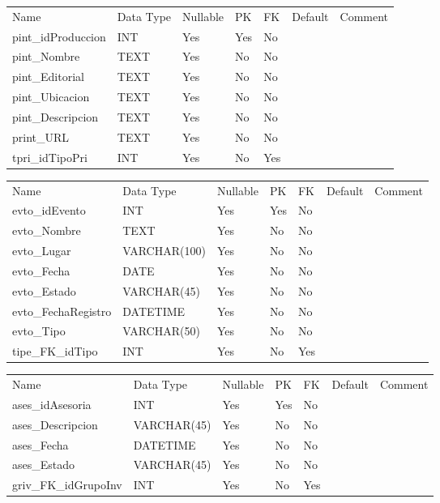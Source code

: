 			\begin{center}
				\begin{tabular}{ |l|l|l|l|l|l|l| }
					\hline
					Name & Data Type & Nullable & PK & FK & Default & Comment \\
					pint_idProduccion & INT & Yes & Yes & No &  & \\ \hline 
pint_Nombre & TEXT & Yes & No & No &  & \\ \hline 
pint_Editorial & TEXT & Yes & No & No &  & \\ \hline 
pint_Ubicacion & TEXT & Yes & No & No &  & \\ \hline 
pint_Descripcion & TEXT & Yes & No & No &  & \\ \hline 
print_URL & TEXT & Yes & No & No &  & \\ \hline 
tpri_idTipoPri & INT & Yes & No & Yes &  & \\ \hline 

				\end{tabular}
			\end{center}
		

			\begin{center}
				\begin{tabular}{ |l|l|l|l|l|l|l| }
					\hline
					Name & Data Type & Nullable & PK & FK & Default & Comment \\
					evto_idEvento & INT & Yes & Yes & No &  & \\ \hline 
evto_Nombre & TEXT & Yes & No & No &  & \\ \hline 
evto_Lugar & VARCHAR(100) & Yes & No & No &  & \\ \hline 
evto_Fecha & DATE & Yes & No & No &  & \\ \hline 
evto_Estado & VARCHAR(45) & Yes & No & No &  & \\ \hline 
evto_FechaRegistro & DATETIME & Yes & No & No &  & \\ \hline 
evto_Tipo & VARCHAR(50) & Yes & No & No &  & \\ \hline 
tipe_FK_idTipo & INT & Yes & No & Yes &  & \\ \hline 

				\end{tabular}
			\end{center}
		

			\begin{center}
				\begin{tabular}{ |l|l|l|l|l|l|l| }
					\hline
					Name & Data Type & Nullable & PK & FK & Default & Comment \\
					ases_idAsesoria & INT & Yes & Yes & No &  & \\ \hline 
ases_Descripcion & VARCHAR(45) & Yes & No & No &  & \\ \hline 
ases_Fecha & DATETIME & Yes & No & No &  & \\ \hline 
ases_Estado & VARCHAR(45) & Yes & No & No &  & \\ \hline 
griv_FK_idGrupoInv & INT & Yes & No & Yes &  & \\ \hline 

				\end{tabular}
			\end{center}
		

